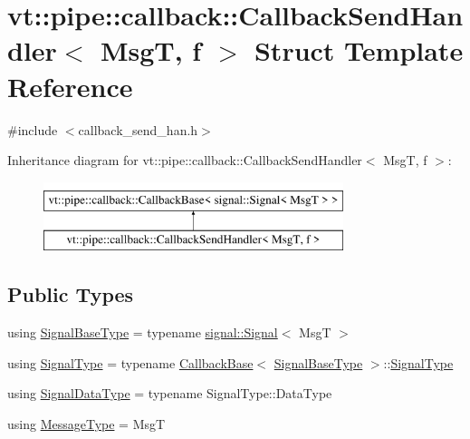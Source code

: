 \hypertarget{structvt_1_1pipe_1_1callback_1_1_callback_send_handler}{}\section{vt\+:\+:pipe\+:\+:callback\+:\+:Callback\+Send\+Handler$<$ MsgT, f $>$ Struct Template Reference}
\label{structvt_1_1pipe_1_1callback_1_1_callback_send_handler}


{\ttfamily \#include $<$callback\+\_\+send\+\_\+han.\+h$>$}

Inheritance diagram for vt\+:\+:pipe\+:\+:callback\+:\+:Callback\+Send\+Handler$<$ MsgT, f $>$\+:\begin{figure}[H]
\begin{center}
\leavevmode
\includegraphics[height=2.000000cm]{structvt_1_1pipe_1_1callback_1_1_callback_send_handler}
\end{center}
\end{figure}
\subsection*{Public Types}
\begin{DoxyCompactItemize}
\item 
using \hyperlink{structvt_1_1pipe_1_1callback_1_1_callback_send_handler_af46916844a27c29e7c6134f962d0964f}{Signal\+Base\+Type} = typename \hyperlink{structvt_1_1pipe_1_1signal_1_1_signal}{signal\+::\+Signal}$<$ MsgT $>$
\item 
using \hyperlink{structvt_1_1pipe_1_1callback_1_1_callback_send_handler_a1d3583e27e8cb606b31de9c3a9daa25b}{Signal\+Type} = typename \hyperlink{structvt_1_1pipe_1_1callback_1_1_callback_base}{Callback\+Base}$<$ \hyperlink{structvt_1_1pipe_1_1callback_1_1_callback_send_handler_af46916844a27c29e7c6134f962d0964f}{Signal\+Base\+Type} $>$\+::\hyperlink{structvt_1_1pipe_1_1callback_1_1_callback_send_handler_a1d3583e27e8cb606b31de9c3a9daa25b}{Signal\+Type}
\item 
using \hyperlink{structvt_1_1pipe_1_1callback_1_1_callback_send_handler_abe4218870eea9f91ac7bbffbc58b92fd}{Signal\+Data\+Type} = typename Signal\+Type\+::\+Data\+Type
\item 
using \hyperlink{structvt_1_1pipe_1_1callback_1_1_callback_send_handler_a36b875a40dee2312857aacd407d5f9d3}{Message\+Type} = MsgT
\end{DoxyCompactItemize}
